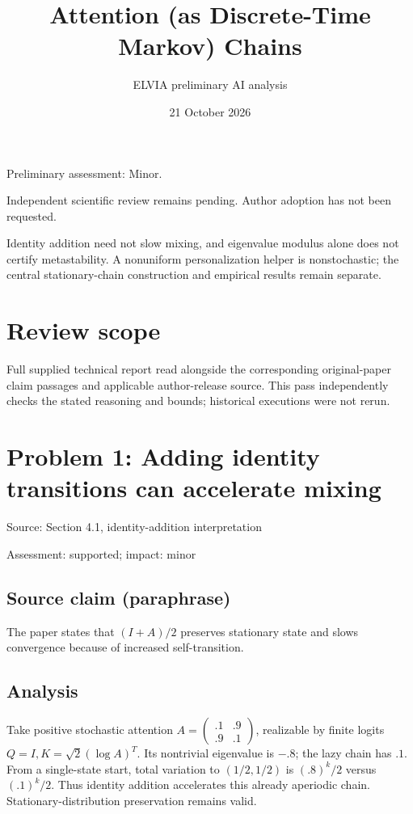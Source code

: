\documentclass[11pt]{article}
\begin{document}
\title{Attention (as Discrete-Time Markov) Chains}

\author{ELVIA preliminary AI analysis}\date{21 October 2026}\maketitle

Preliminary assessment: Minor.\par

Independent scientific review remains pending. Author adoption has not been requested.

Identity addition need not slow mixing, and eigenvalue modulus alone does not certify metastability. A nonuniform personalization helper is nonstochastic; the central stationary-chain construction and empirical results remain separate.

\section*{Review scope}

Full supplied technical report read alongside the corresponding original-paper claim passages and applicable author-release source. This pass independently checks the stated reasoning and bounds; historical executions were not rerun.

\section*{Problem 1: Adding identity transitions can accelerate mixing}

Source: Section 4.1, identity-addition interpretation

Assessment: supported; impact: minor

\subsection*{Source claim (paraphrase)}

The paper states that \((I+A)/2\) preserves stationary state and slows convergence because of increased self-transition.

\subsection*{Analysis}

Take positive stochastic attention \(A=\left(\begin{smallmatrix}.1&.9\\.9&.1\end{smallmatrix}\right)\), realizable by finite logits \(Q=I,K=\sqrt2(\log A)^T\). Its nontrivial eigenvalue is \(-.8\); the lazy chain has \(.1\). From a single-state start, total variation to \((1/2,1/2)\) is \((.8)^k/2\) versus \((.1)^k/2\). Thus identity addition accelerates this already aperiodic chain. Stationary-distribution preservation remains valid.
\end{document}
